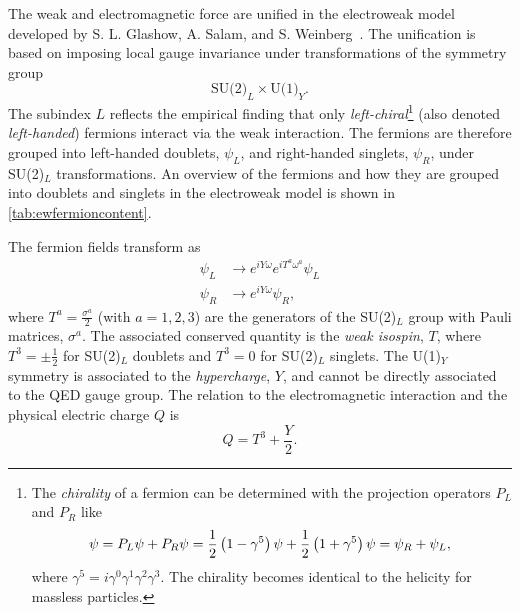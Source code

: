 The weak and electromagnetic force are unified in the electroweak model developed by S. L. Glashow, A. Salam, and S. Weinberg~\cite{GLASHOW1961579,SALAM1964168,PhysRevLett.19.1264}.
The unification is based on imposing local gauge invariance under transformations of the symmetry group
\begin{equation}
  \text{SU(2)}_L \times \text{U(1)}_Y.
\end{equation}
The subindex $L$ reflects the empirical finding that only \emph{left-chiral}\footnote{
  The \emph{chirality} of a fermion can be determined with the projection operators $P_L$ and $P_R$ like
  \begin{equation*}
    \psi       = P_L \psi + P_R \psi = \frac{1}{2} \left( 1 - \gamma^5 \right) \psi + \frac{1}{2} \left( 1 + \gamma^5 \right) \psi = \psi_R + \psi_L,                                \\
  \end{equation*}
  where $\gamma^5 = i\gamma^0\gamma^1\gamma^2\gamma^3$. The chirality becomes identical to the helicity for massless particles.
} (also denoted \emph{left-handed}) fermions interact via the weak interaction.
The fermions are therefore grouped into left-handed doublets, $\psi_L$, and right-handed singlets, $\psi_R$, under SU(2)$_L$ transformations. An overview of the fermions and how they are grouped into doublets and singlets in the electroweak model is shown in \cref{tab:ewfermioncontent}.

The fermion fields transform as
\begin{align}
  \psi_L & \rightarrow e^{iY\omega} e^{iT^a\omega^a} \psi_L \\
  \psi_R & \rightarrow e^{iY\omega} \psi_R,
\end{align}
where $T^a = \frac{\sigma^a}{2}$ (with $a = 1, 2, 3$) are the generators of the SU(2)$_L$ group with Pauli matrices, $\sigma^a$.
The associated conserved quantity is the \emph{weak isospin}, $T$, where $T^3 = \pm \frac{1}{2}$ for SU(2)$_L$ doublets and $T^3 = 0$ for SU(2)$_L$ singlets.
The U(1)$_Y$ symmetry is associated to the \emph{hypercharge}, $Y$, and cannot be directly associated to the QED gauge group.
The relation to the electromagnetic interaction and the physical electric charge $Q$ is
\begin{equation}
  Q = T^3 + \frac{Y}{2}.
\end{equation}

